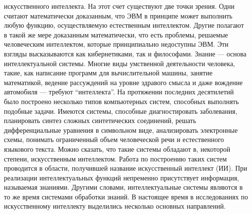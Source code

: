искусственного интеллекта. На этот счет существуют две точки зрения. Одни считают математически доказанным, что ЭВМ в принципе может выполнить любую функцию, осуществляемую естественным интеллектом. Другие полагают в такой же мере доказанным математически, что есть проблемы, решаемые человеческим интеллектом, которые принципиально недоступны ЭВМ. Эти взгляды высказываются как кибернетиками, так и философами. Знание --- основа интеллектуальной системы. Многие виды умственной деятельности человека, такие, как написание программ для вычислительной машины, занятие математикой, ведение рассуждений на уровне здравого смысла и даже вождение автомобиля --- требуют ``интеллекта''. На протяжении последних десятилетий было построено несколько типов компьютерных систем, способных выполнять подобные задачи. Имеются системы, способные диагностировать заболевания, планировать синтез сложных синтетических соединений, решать дифференциальные уравнения в символьном виде, анализировать электронные схемы, понимать ограниченный объем человеческой речи и естественного языкового текста. Можно сказать, что такие системы обладают в, некоторой степени, искусственным интеллектом. Работа по построению таких систем проводится в области, получившей название искусственный интеллект (ИИ). При реализации интеллектуальных функций непременно присутствует информация, называемая знаниями. Другими словами, интеллектуальные системы являются в то же время системами обработки знаний. В настоящее время в исследованиях по искусственному интеллекту выделились несколько основных направлений.

